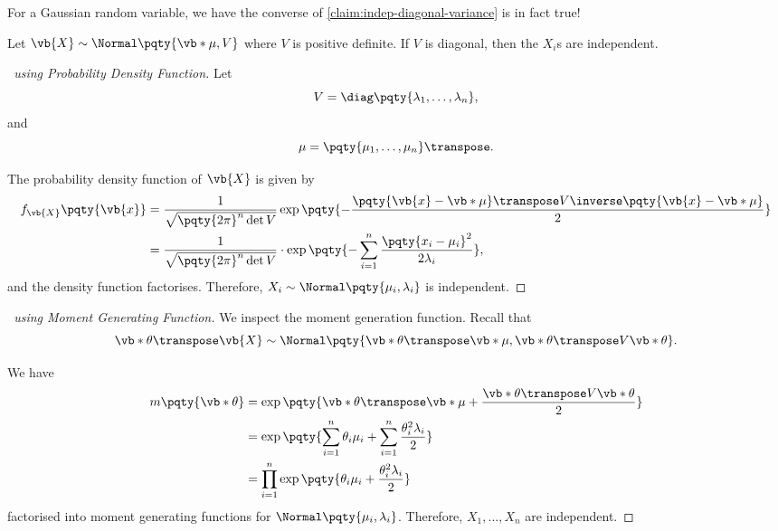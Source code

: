 For a Gaussian random variable, we have the converse of \autoref{claim:indep-diagonal-variance} is in fact true!

\begin{lemma}
    \label{lem:diagonal-variance-independence-gaussian}%
    Let \(\vb{X} \sim \Normal\pqty{\vb*{\mu}, V}\) where \(V\) is positive definite. If \(V\) is diagonal, then the \(X_i\)s are independent.
\end{lemma}

\begin{proof}[\proofname\ using Probability Density Function]
    Let
    \[
        V = \diag\pqty{\lambda_1, \ldots, \lambda_n},
    \]
    and
    \[
        \mu = \pqty{\mu_1, \ldots, \mu_n}\transpose.
    \]

    The probability density function of \(\vb{X}\) is given by
    \begin{align*}
        f_{\vb{X}} \pqty{\vb{x}} &= \frac{1}{\sqrt{\pqty{2 \pi}^n \det V}} \exp \pqty{- \frac{\pqty{\vb{x} - \vb*{\mu}} \transpose V\inverse \pqty{\vb{x} - \vb*{\mu}}}{2}} \\
        &= \frac{1}{\sqrt{\pqty{2\pi}^n \det V}} \cdot \exp\pqty{- \sum_{i = 1}^{n} \frac{\pqty{x_i - \mu_i}^2}{2 \lambda_i}},
    \end{align*}
    and the density function factorises. Therefore, \(X_i \sim \Normal\pqty{\mu_i, \lambda_i}\) is independent.
\end{proof}

\begin{proof}[\proofname\ using Moment Generating Function]
    We inspect the moment generation function. Recall that
    \[
        \vb*{\theta}\transpose \vb{X} \sim \Normal\pqty{\vb*{\theta}\transpose \vb*{\mu}, \vb*{\theta}\transpose V \vb*{\theta}}.
    \]
    
    We have
    \begin{align*}
        m\pqty{\vb*{\theta}} &= \exp\pqty{\vb*{\theta}\transpose \vb*{\mu} + \frac{\vb*{\theta}\transpose V \vb*{\theta}}{2}} \\
        &= \exp\pqty{\sum_{i = 1}^{n} \theta_i \mu_i + \sum_{i = 1}^{n} \frac{\theta_i^2 \lambda_i}{2}} \\
        &= \prod_{i = 1}^{n} \exp\pqty{\theta_i \mu_i + \frac{\theta_i^2 \lambda_i}{2}}
    \end{align*}
    factorised into moment generating functions for \(\Normal\pqty{\mu_i, \lambda_i}\). Therefore, \(X_1, \ldots, X_n\) are independent.
\end{proof}

